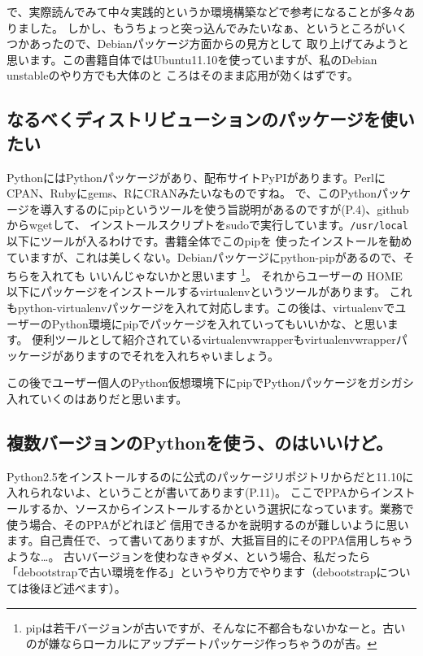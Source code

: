 \documentclass[mingoth,a4paper]{jsarticle}
\begin{document}
で、実際読んでみて中々実践的というか環境構築などで参考になることが多々ありました。
しかし、もうちょっと突っ込んでみたいなぁ、というところがいくつかあったので、Debianパッケージ方面からの見方として
取り上げてみようと思います。この書籍自体ではUbuntu11.10を使っていますが、私のDebian unstableのやり方でも大体のと
ころはそのまま応用が効くはずです。


\subsection{なるべくディストリビューションのパッケージを使いたい}

PythonにはPythonパッケージがあり、配布サイトPyPIがあります。PerlにCPAN、Rubyにgems、RにCRANみたいなものですね。
で、このPythonパッケージを導入するのにpipというツールを使う旨説明があるのですが(P.4)、githubからwgetして、
インストールスクリプトをsudoで実行しています。\verb!/usr/local! 以下にツールが入るわけです。書籍全体でこのpipを
使ったインストールを勧めていますが、これは美しくない。Debianパッケージにpython-pipがあるので、そちらを入れても
いいんじゃないかと思います
\footnote{pipは若干バージョンが古いですが、そんなに不都合もないかなーと。古いのが嫌ならローカルにアップデートパッケージ作っちゃうのが吉。}。
それからユーザーの HOME 以下にパッケージをインストールするvirtualenvというツールがあります。
これもpython-virtualenvパッケージを入れて対応します。この後は、virtualenvでユーザーのPython環境にpipでパッケージを入れていってもいいかな、と思います。
便利ツールとして紹介されているvirtualenvwrapperもvirtualenvwrapperパッケージがありますのでそれを入れちゃいましょう。


この後でユーザー個人のPython仮想環境下にpipでPythonパッケージをガシガシ入れていくのはありだと思います。

\subsection{複数バージョンのPythonを使う、のはいいけど。}

Python2.5をインストールするのに公式のパッケージリポジトリからだと11.10に入れられないよ、ということが書いてあります(P.11)。
ここでPPAからインストールするか、ソースからインストールするかという選択になっています。業務で使う場合、そのPPAがどれほど
信用できるかを説明するのが難しいように思います。自己責任で、って書いてありますが、大抵盲目的にそのPPA信用しちゃうような…。
古いバージョンを使わなきゃダメ、という場合、私だったら「debootstrapで古い環境を作る」というやり方でやります（debootstrapについては後ほど述べます）。
\end{document}
